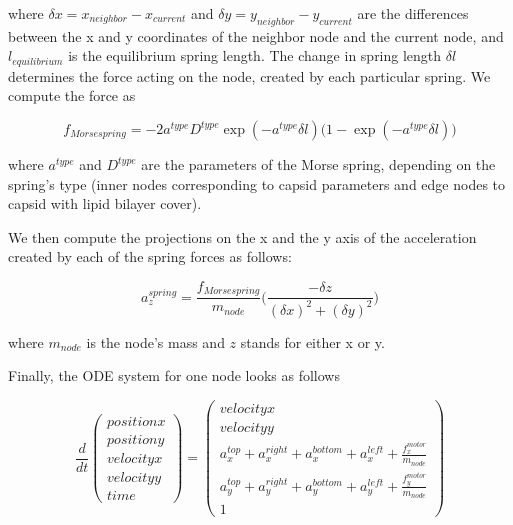 where $\delta x = x_{neighbor} - x_{current}$ and $\delta y = y_{neighbor} - y_{current}$ are the differences between the x and y coordinates of the neighbor node and the current node, and $l_{equilibrium}$ is the equilibrium spring length. The change in spring length $\delta l$ determines the force acting on the node, created by each particular spring. We compute the force as

\begin{equation}
f_{Morse spring} = -2 a^{type} D^{type} \exp(-a^{type} \delta l) \big(1 - \exp(-a^{type} \delta l)\big)
\end{equation}
 
where $a^{type}$ and $D^{type}$ are the parameters of the Morse spring, depending on the spring’s type (inner nodes corresponding to capsid parameters and edge nodes to capsid with lipid bilayer cover).

We then compute the projections on the x and the y axis of the acceleration created by each of the spring forces as follows:

\begin{equation}
a^{spring}_z = \frac{f_{Morse spring}}{m_{node}} \big(\frac{-\delta z}{(\delta x)^2 + (\delta y)^2}\big)
\end{equation}

where $m_{node}$ is the node’s mass and $z$ stands for either x or  y.

Finally, the ODE system for one node looks as follows

\begin{equation}
\frac{d}{dt}
\begin{pmatrix}
position x\\
position y\\
velocity x\\
velocity y\\
time
\end{pmatrix}
=
\begin{pmatrix}
velocity x\\
velocity y\\
a^{top}_x + a^{right}_x + a^{bottom}_x + a^{left}_x + \frac{f^{motor}_x}{m_{node}}\\
a^{top}_y + a^{right}_y + a^{bottom}_y + a^{left}_y + \frac{f^{motor}_y}{m_{node}}\\
1
\end{pmatrix}
\end{equation}

